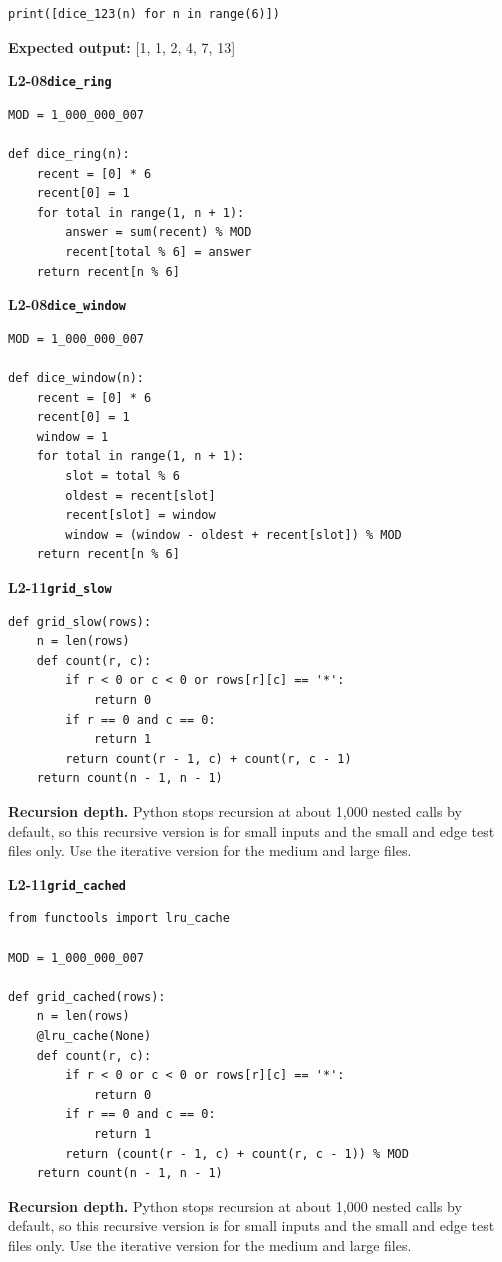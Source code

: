\documentclass[11pt,a4paper]{article}
\begin{document}
\begin{lstlisting}
print([dice_123(n) for n in range(6)])
\end{lstlisting}
\textbf{Expected output:} [1, 1, 2, 4, 7, 13]
\par\bigskip
{}
{\color{teal}\textbf{L2-08}}\quad\textbf{\texttt{dice\_ring}}\label{L2-code-dice_ring}\par
\begin{lstlisting}[style=numbered]
MOD = 1_000_000_007

def dice_ring(n):
    recent = [0] * 6
    recent[0] = 1
    for total in range(1, n + 1):
        answer = sum(recent) % MOD
        recent[total % 6] = answer
    return recent[n % 6]
\end{lstlisting}
\par\bigskip
{}
{\color{teal}\textbf{L2-08}}\quad\textbf{\texttt{dice\_window}}\label{L2-code-dice_window}\par
\begin{lstlisting}[style=numbered]
MOD = 1_000_000_007

def dice_window(n):
    recent = [0] * 6
    recent[0] = 1
    window = 1
    for total in range(1, n + 1):
        slot = total % 6
        oldest = recent[slot]
        recent[slot] = window
        window = (window - oldest + recent[slot]) % MOD
    return recent[n % 6]
\end{lstlisting}
\par\bigskip
{}
{\color{teal}\textbf{L2-11}}\quad\textbf{\texttt{grid\_slow}}\label{L2-code-grid_slow}\par
\begin{lstlisting}[style=numbered]
def grid_slow(rows):
    n = len(rows)
    def count(r, c):
        if r < 0 or c < 0 or rows[r][c] == '*':
            return 0
        if r == 0 and c == 0:
            return 1
        return count(r - 1, c) + count(r, c - 1)
    return count(n - 1, n - 1)
\end{lstlisting}
\textbf{Recursion depth.} Python stops recursion at about 1,000 nested calls by default, so this recursive version is for small inputs and the small and edge test files only. Use the iterative version for the medium and large files.

\par\bigskip
{}
{\color{teal}\textbf{L2-11}}\quad\textbf{\texttt{grid\_cached}}\label{L2-code-grid_cached}\par
\begin{lstlisting}[style=numbered]
from functools import lru_cache

MOD = 1_000_000_007

def grid_cached(rows):
    n = len(rows)
    @lru_cache(None)
    def count(r, c):
        if r < 0 or c < 0 or rows[r][c] == '*':
            return 0
        if r == 0 and c == 0:
            return 1
        return (count(r - 1, c) + count(r, c - 1)) % MOD
    return count(n - 1, n - 1)
\end{lstlisting}
\textbf{Recursion depth.} Python stops recursion at about 1,000 nested calls by default, so this recursive version is for small inputs and the small and edge test files only. Use the iterative version for the medium and large files.
\end{document}
